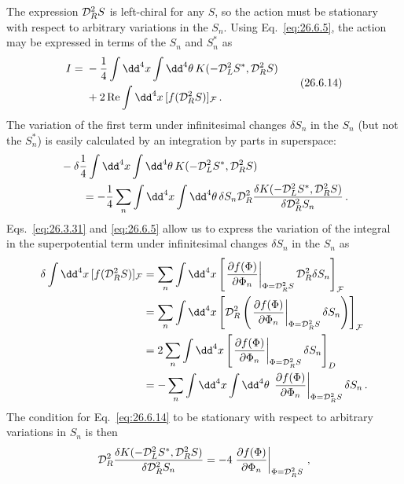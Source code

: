 The expression \(\mathcal{D}_R^2S\) is left-chiral for any \(S\), so the action
must be stationary with respect to arbitrary variations in the \(S_n\). Using
Eq.~\eqref{eq:26.6.5}, the action may be expressed in terms of the \(S_n\) and
\(S_n^*\) as
\begin{equation}
  \begin{aligned}
  I={}&-\frac14\int \dd^4x\int \dd^4\theta\,
  K(-\SuperD_L^2S^*,\SuperD_R^2S)
  \\
  &+2\operatorname{Re}\int \dd^4x\,
  [f(\SuperD_R^2S)]_{\mathcal{F}}\,.
  \end{aligned}
  \tag{26.6.14}\label{eq:26.6.14}
\end{equation}
The variation of the first term under infinitesimal changes \(\delta S_n\) in
the \(S_n\) (but not the \(S_n^*\)) is easily calculated by an integration by
parts in superspace:
\[
  \begin{aligned}
  &-\delta\frac14\int \dd^4x\int \dd^4\theta\,
    K(-\SuperD_L^2S^*,\SuperD_R^2S)
  \\
  &\qquad=-\frac14\sum_n\int \dd^4x\int \dd^4\theta\,
    \delta S_n\SuperD_R^2
    \frac{\delta K(-\SuperD_L^2S^*,\SuperD_R^2S)}
         {\delta\SuperD_R^2S_n}\,.
  \end{aligned}
\]
Eqs.~\eqref{eq:26.3.31} and \eqref{eq:26.6.5} allow us to express the
variation of the integral in the superpotential term under infinitesimal
changes \(\delta S_n\) in the \(S_n\) as
\[
  \begin{aligned}
  \delta\int \dd^4x\,[f(\SuperD_R^2S)]_{\mathcal{F}}
  &=
  \sum_n\int \dd^4x
  \left[
    \left.
    \frac{\partial f(\Phi)}{\partial\Phi_n}
    \right|_{\Phi=\SuperD_R^2S}
    \SuperD_R^2\delta S_n
  \right]_{\mathcal{F}}
  \\
  &=
  \sum_n\int \dd^4x
  \left[
    \SuperD_R^2\left(
      \left.
      \frac{\partial f(\Phi)}{\partial\Phi_n}
      \right|_{\Phi=\SuperD_R^2S}
      \delta S_n
    \right)
  \right]_{\mathcal{F}}
  \\
  &=2\sum_n\int \dd^4x
  \left[
    \left.
    \frac{\partial f(\Phi)}{\partial\Phi_n}
    \right|_{\Phi=\SuperD_R^2S}
    \delta S_n
  \right]_D
  \\
  &=-\sum_n\int \dd^4x\int \dd^4\theta\,
    \left.
    \frac{\partial f(\Phi)}{\partial\Phi_n}
    \right|_{\Phi=\SuperD_R^2S}
    \delta S_n\,.
  \end{aligned}
\]
The condition for Eq.~\eqref{eq:26.6.14} to be stationary with respect to
arbitrary variations in \(S_n\) is then
\[
  \mathcal{D}_R^2
  \frac{\delta K(-\mathcal{D}_L^2S^*,\mathcal{D}_R^2S)}
       {\delta\mathcal{D}_R^2S_n}
  =-4
  \left.
  \frac{\partial f(\Phi)}{\partial\Phi_n}
  \right|_{\Phi=\mathcal{D}_R^2S}\,,
\]
